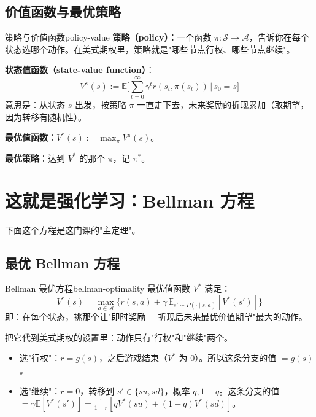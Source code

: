 \documentclass[11pt,a4paper]{ctexart}
\newcommand{\E}{\mathbb{E}}
\newcommand{\1}{\mathbf{1}}
\begin{document}
\subsection{价值函数与最优策略}

\begin{defn}{策略与价值函数}{policy-value}
\textbf{策略（policy）}：一个函数 $\pi: \mathcal{S} \to \mathcal{A}$，告诉你在每个状态选哪个动作。在美式期权里，策略就是"哪些节点行权、哪些节点继续"。

\textbf{状态值函数（state-value function）}：
\[
V^\pi(s) := \E\Big[\sum_{t=0}^{\infty} \gamma^t r(s_t, \pi(s_t)) \,\Big|\, s_0 = s\Big]
\]
意思是：从状态 $s$ 出发，按策略 $\pi$ 一直走下去，未来奖励的折现累加（取期望，因为转移有随机性）。

\textbf{最优值函数}：$V^*(s) := \max_\pi V^\pi(s)$。

\textbf{最优策略}：达到 $V^*$ 的那个 $\pi$，记 $\pi^*$。
\end{defn}

\section{这就是强化学习：Bellman 方程}

下面这个方程是这门课的"主定理"。

\subsection{最优 Bellman 方程}

\begin{idea}{Bellman 最优方程}{bellman-optimality}
最优值函数 $V^*$ 满足：
\[
\boxed{
V^*(s) = \max_{a \in \mathcal{A}}\Big\{r(s,a) + \gamma\, \E_{s'\sim P(\cdot\mid s,a)}[V^*(s')]\Big\}
}
\]
即：在每个状态，挑那个让"即时奖励 + 折现后未来最优价值期望"最大的动作。
\end{idea}

把它代到美式期权的设置里：动作只有"行权"和"继续"两个。

\begin{itemize}[leftmargin=*]
    \item 选"行权"：$r = g(s)$，之后游戏结束（$V^*$ 为 0）。所以这条分支的值 $= g(s)$。
    \item 选"继续"：$r = 0$，转移到 $s' \in \{su, sd\}$，概率 $q, 1-q$。这条分支的值 $= \gamma \E[V^*(s')] = \frac{1}{1+r}[q V^*(su) + (1-q) V^*(sd)]$。
\end{itemize}
\end{document}
